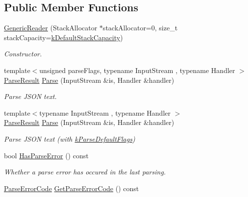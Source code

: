 \subsection*{Public Member Functions}
\begin{DoxyCompactItemize}
\item 
\hyperlink{class_generic_reader_aab875a34b3092df9fb4e2b8eac6dbb96}{Generic\+Reader} (Stack\+Allocator $\ast$stack\+Allocator=0, size\+\_\+t stack\+Capacity=\hyperlink{class_generic_reader_ac507ea8672bf2b5d01b35583c0597f15}{k\+Default\+Stack\+Capacity})
\begin{DoxyCompactList}\small\item\em Constructor. \end{DoxyCompactList}\item 
{\footnotesize template$<$unsigned parse\+Flags, typename Input\+Stream , typename Handler $>$ }\\\hyperlink{struct_parse_result}{Parse\+Result} \hyperlink{class_generic_reader_a0c450620d14ff1824e58bb7bd9b42099}{Parse} (Input\+Stream \&is, Handler \&handler)
\begin{DoxyCompactList}\small\item\em Parse J\+S\+ON text. \end{DoxyCompactList}\item 
{\footnotesize template$<$typename Input\+Stream , typename Handler $>$ }\\\hyperlink{struct_parse_result}{Parse\+Result} \hyperlink{class_generic_reader_a76d91e5fd8dfe48aea7dd6d8a51dd6dc}{Parse} (Input\+Stream \&is, Handler \&handler)
\begin{DoxyCompactList}\small\item\em Parse J\+S\+ON text (with \hyperlink{reader_8h_ab7be7dabe6ffcba60fad441505583450a9104b0946d648e9467cb7a967401ec80}{k\+Parse\+Default\+Flags}) \end{DoxyCompactList}\item 
bool \hyperlink{class_generic_reader_aa9d10652062557ebf26cf414bfeabf84}{Has\+Parse\+Error} () const \hypertarget{class_generic_reader_aa9d10652062557ebf26cf414bfeabf84}{}\label{class_generic_reader_aa9d10652062557ebf26cf414bfeabf84}

\begin{DoxyCompactList}\small\item\em Whether a parse error has occured in the last parsing. \end{DoxyCompactList}\item 
\hyperlink{group___r_a_p_i_d_j_s_o_n___e_r_r_o_r_s_ga8d4b32dfc45840bca189ade2bbcb6ba7}{Parse\+Error\+Code} \hyperlink{class_generic_reader_ac45a26246877c4daa85021ae67caa017}{Get\+Parse\+Error\+Code} () const \hypertarget{class_generic_reader_ac45a26246877c4daa85021ae67caa017}{}\label{class_generic_reader_ac45a26246877c4daa85021ae67caa017}


\end{DoxyCompactItemize}
